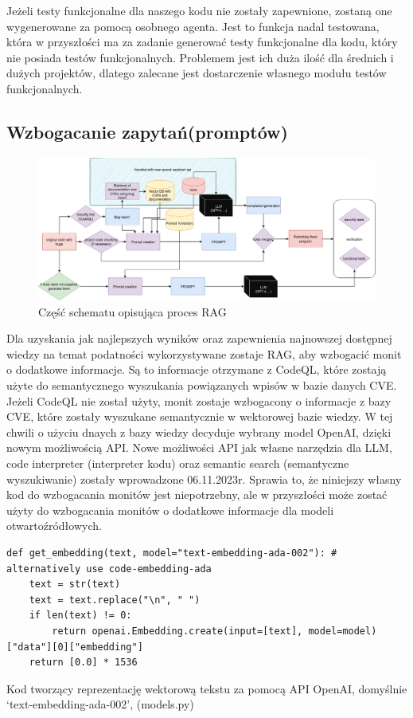Jeżeli testy funkcjonalne dla naszego kodu nie zostały zapewnione, zostaną one wygenerowane za pomocą osobnego agenta. 
Jest to funkcja nadal testowana, która w przyszłości ma za zadanie generować testy funkcjonalne dla kodu, który nie posiada testów funkcjonalnych. 
Problemem jest ich duża ilość dla średnich i dużych projektów, dlatego zalecane jest dostarczenie własnego modułu testów funkcjonalnych.

\subsection{Wzbogacanie zapytań(promptów)}
\begin{figure}[h]
    \centering
    \includegraphics[clip, trim=3cm 11cm 3cm 0cm, width=0.9\linewidth]{img/gptester.drawio.png}
    \caption{Część schematu opisująca proces RAG}
    \label{fig:RAG-schemat}
\end{figure}

Dla uzyskania jak najlepszych wyników oraz zapewnienia najnowszej dostępnej wiedzy na temat podatności wykorzystywane zostaje RAG, aby wzbogacić monit o dodatkowe informacje. Są to informacje otrzymane z CodeQL, które zostają użyte do semantycznego wyszukania powiązanych wpisów w bazie danych CVE. 
Jeżeli CodeQL nie został użyty, monit zostaje wzbogacony o informacje z bazy CVE, które zostały wyszukane semantycznie w wektorowej bazie wiedzy. W tej chwili o użyciu dnaych z bazy wiedzy decyduje wybrany model OpenAI, dzięki nowym możliwością API. 
Nowe możliwości API jak własne narzędzia dla LLM, code interpreter (interpreter kodu) oraz semantic search (semantyczne wyszukiwanie) zostały wprowadzone 06.11.2023r.
Sprawia to, że niniejszy własny kod do wzbogacania monitów jest niepotrzebny, ale w przyszłości może zostać użyty do wzbogacania monitów o dodatkowe informacje dla modeli otwartoźródłowych. 
\begin{listing}
    \begin{verbatim}  
def get_embedding(text, model="text-embedding-ada-002"): # alternatively use code-embedding-ada
    text = str(text)
    text = text.replace("\n", " ")
    if len(text) != 0:
        return openai.Embedding.create(input=[text], model=model)["data"][0]["embedding"]
    return [0.0] * 1536

    \end{verbatim}
    \caption{Kod tworzący reprezentację wektorową tekstu za pomocą API OpenAI, domyślnie `text-embedding-ada-002', (models.py)} 
    \label{listing:vector_embedding}
\end{listing}
    
